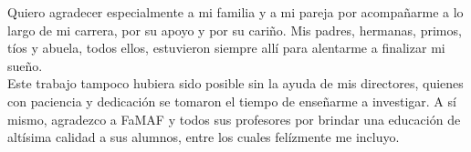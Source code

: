 \begin{acknowledgements}
Quiero agradecer especialmente a mi familia y a mi pareja por acompañarme a lo largo de mi carrera, por su apoyo y por su cariño. Mis padres, hermanas, primos, tíos y abuela, todos ellos, estuvieron siempre allí para alentarme a finalizar mi sueño.\\
Este trabajo tampoco hubiera sido posible sin la ayuda de mis directores, quienes con paciencia y dedicación se tomaron el tiempo de enseñarme a investigar. A sí mismo, agradezco a FaMAF y todos sus profesores por brindar una educación de altísima calidad a sus alumnos, entre los cuales felízmente me incluyo. 
\end{acknowledgements}
